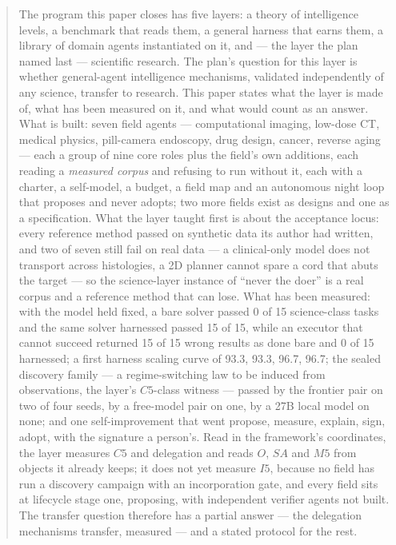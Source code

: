 \documentclass[11pt]{article}
\theoremstyle{definition}
\begin{document}
\begin{abstract}
The program this paper closes has five layers: a theory of intelligence levels, a benchmark that reads them, a general harness that earns them, a library of domain agents instantiated on it, and --- the layer the plan named last --- scientific research. The plan's question for this layer is whether general-agent intelligence mechanisms, validated independently of any science, transfer to research. This paper states what the layer is made of, what has been measured on it, and what would count as an answer. What is built: seven field agents --- computational imaging, low-dose CT, medical physics, pill-camera endoscopy, drug design, cancer, reverse aging --- each a group of nine core roles plus the field's own additions, each reading a \emph{measured corpus} and refusing to run without it, each with a charter, a self-model, a budget, a field map and an autonomous night loop that proposes and never adopts; two more fields exist as designs and one as a specification. What the layer taught first is about the acceptance locus: every reference method passed on synthetic data its author had written, and two of seven still fail on real data --- a clinical-only model does not transport across histologies, a 2D planner cannot spare a cord that abuts the target --- so the science-layer instance of ``never the doer'' is a real corpus and a reference method that can lose. What has been measured: with the model held fixed, a bare solver passed 0 of 15 science-class tasks and the same solver harnessed passed 15 of 15, while an executor that cannot succeed returned 15 of 15 wrong results as done bare and 0 of 15 harnessed; a first harness scaling curve of 93.3, 93.3, 96.7, 96.7; the sealed discovery family --- a regime-switching law to be induced from observations, the layer's $C5$-class witness --- passed by the frontier pair on two of four seeds, by a free-model pair on one, by a 27B local model on none; and one self-improvement that went propose, measure, explain, sign, adopt, with the signature a person's. Read in the framework's coordinates, the layer measures $C5$ and delegation and reads $O$, $SA$ and $M5$ from objects it already keeps; it does not yet measure $I5$, because no field has run a discovery campaign with an incorporation gate, and every field sits at lifecycle stage one, proposing, with independent verifier agents not built. The transfer question therefore has a partial answer --- the delegation mechanisms transfer, measured --- and a stated protocol for the rest.
\end{abstract}
\end{document}
